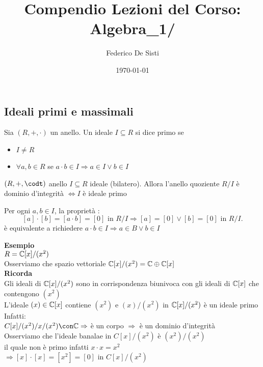 \documentclass{article}
\title{Compendio Lezioni del Corso: Algebra_1/}
\date{\today}
\author{Federico De Sisti}
\begin{document}
\maketitle
\maketitle
	\newpage
	\subsection{Ideali primi e massimali}
	\begin{defi}
		Sia $(R, +, \cdot)$ un anello. Un ideale $I\subseteq R$ si dice primo se
		 \begin{itemize}
			 \item $I\neq R$
			 \item $\forall a,b\in R$ se $a\cdot b\in I \Rightarrow a\in I \vee b\in I$
		\end{itemize}
	\end{defi}
	\begin{teo}
		$(R,+,\codt)$ anello $I\subseteq R$ ideale (bilatero). Allora l'anello quoziente $R/I$ è dominio d'integrità $ \Leftrightarrow I$ è ideale primo
	\end{teo}
	\begin{dimo}
		Per ogni $a,b\in I$, la proprietà :
		\[
			[a]\cdot[b] = [a\cdot b] = [0] \text { in } R/I \Rightarrow [a] = [0] \vee [b] = [0] \text{ in } R/I
		.\] 
		è equivalente a richiedere $a\cdot b \in I  \Rightarrow a\in B \vee b\in I$
	\end{dimo}
	\textbf{Esempio}\\
	$R = \mathbb{C}[x]/(x^2)$\\
	Osserviamo che spazio vettoriale  $\mathbb{C}[x]/(x^2) = \mathbb{C}\oplus \mathbb{C}[x]$ \\
	\textbf{Ricorda}\\
	Gli ideali di $\mathbb{C}[x]/(x^2)$ sono in corrispondenza biunivoca con gli ideali di  $\mathbb{C}[x]$ che contengono $(x^2)$\\
	L'ideale  $(x)\in\mathbb{C}[x]$ contiene $(x^2)$ e $(x)/(x^2)$ in $\mathbb{C}[x]/(x^2)$ è un ideale primo\\
	Infatti:\\
	$C[x]/(x^2)/x/(x^2)\con \C \Rightarrow $ è un corpo $ \Rightarrow  $ è un dominio d'integrità\\
	Osserviamo che l'ideale banalae in $C[x]/(x^2)$ è  $(x^2)/(x^2)$\\
	il quale non è primo infatti  $x\cdot x = x^2$\\
	$ \Rightarrow [x]\cdot[x] = [x^2] = [0] $ in $C[x]/(x^2)$\\
\end{document}
